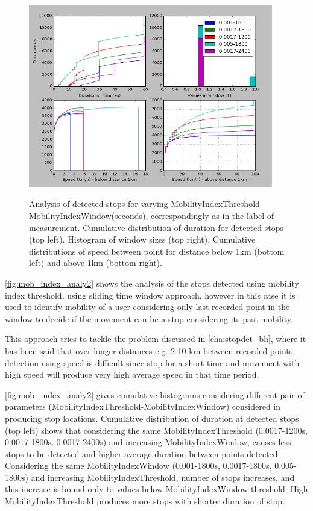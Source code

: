 \begin{figure}[!ht]
	\centering
	\includegraphics[width=0.95\textwidth]{images/mob_index_analy2.png}\\
	\caption{ Analysis of detected stops for varying MobilityIndexThreshold-MobilityIndexWindow(seconds), correspondingly as in the label of measurement. Cumulative distribution of duration for detected stops (top left). Histogram of window sizes (top right). Cumulative distributions of speed between point for distance below 1km (bottom left) and above 1km (bottom right). }
	\label{fig:mob_index_analy2}
\end{figure}
\FloatBarrier 
 
\autoref{fig:mob_index_analy2} shows the analysis of the stops detected using mobility index threshold, using sliding time window approach, however in this case it is used to identify mobility of a user considering only last recorded point in the window to decide if the movement can be a stop considering its past mobility.

This approach tries to tackle the problem discussed in \autoref{cha:stopdet_bh}, where it has been said that over longer distances e.g. 2-10 km between recorded points, detection using speed is difficult since stop for a short time and movement with high speed will produce very high average speed in that time period. 

\autoref{fig:mob_index_analy2} gives cumulative histograms considering different pair of parameters (MobilityIndexThreshold-MobilityIndexWindow) considered in producing stop locations. Cumulative distribution of duration at detected stops (top left) shows that considering the same MobilityIndexThreshold (0.0017-1200s, 0.0017-1800s, 0.0017-2400s) and increasing MobilityIndexWindow, causes less stops to be detected and higher average duration between points detected. Considering the same MobilityIndexWindow (0.001-1800s, 0.0017-1800s, 0.005-1800s) and increasing MobilityIndexThreshold, number of stops increases, and this increase is bound only to values below MobilityIndexWindow threshold. High MobilityIndexThreshold produces more stops with shorter duration of stop. 

